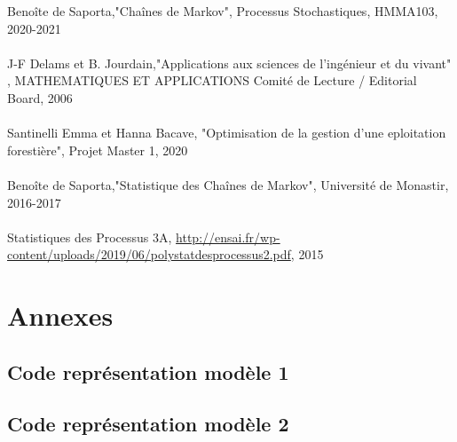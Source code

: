 \documentclass[12pt,a4paper]{report}
\theoremstyle{remark}
\begin{document}
\begin{thebibliography}{8} 
 Benoîte de Saporta,{"Chaînes de Markov",  Processus Stochastiques, HMMA103, 2020-2021}
\\
\\
 J-F Delams et B. Jourdain,{"Applications aux sciences de l'ingénieur et du vivant" , MATHEMATIQUES ET APPLICATIONS Comité de Lecture / Editorial Board, 2006 } 
\\
\\
 Santinelli Emma et Hanna Bacave, {"Optimisation de la gestion d'une eploitation forestière", Projet Master 1, 2020}
\\
\\
 Benoîte de Saporta,{"Statistique des Chaînes de Markov",  Université de Monastir, 2016-2017} 
\\
\\
 Statistiques des Processus 3A, {\url{http://ensai.fr/wp-content/uploads/2019/06/polystatdesprocessus2.pdf}, 2015}
\end{thebibliography}




\chapter*{Annexes}

\section{Code représentation modèle 1}


\section{Code représentation modèle 2}
\end{document}
